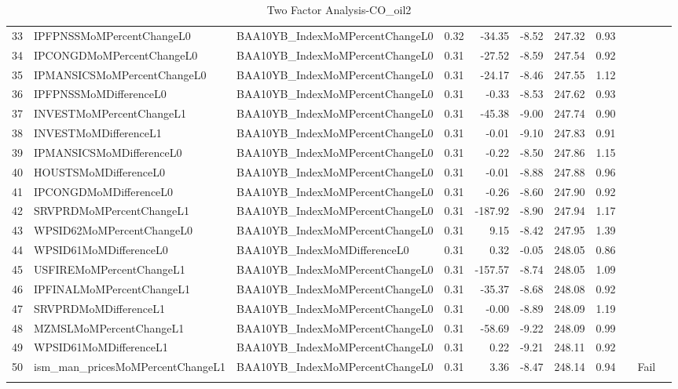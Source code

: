 \begin{longtable}{rllrrrrrlll}
  33 & IPFPNSSMoMPercentChangeL0 & BAA10YB\_IndexMoMPercentChangeL0 & 0.32 & -34.35 & -8.52 & 247.32 & 0.93 &  &  &  \\ 
  34 & IPCONGDMoMPercentChangeL0 & BAA10YB\_IndexMoMPercentChangeL0 & 0.31 & -27.52 & -8.59 & 247.54 & 0.92 &  &  &  \\ 
  35 & IPMANSICSMoMPercentChangeL0 & BAA10YB\_IndexMoMPercentChangeL0 & 0.31 & -24.17 & -8.46 & 247.55 & 1.12 &  &  &  \\ 
  36 & IPFPNSSMoMDifferenceL0 & BAA10YB\_IndexMoMPercentChangeL0 & 0.31 & -0.33 & -8.53 & 247.62 & 0.93 &  &  &  \\ 
  37 & INVESTMoMPercentChangeL1 & BAA10YB\_IndexMoMPercentChangeL0 & 0.31 & -45.38 & -9.00 & 247.74 & 0.90 &  &  &  \\ 
  38 & INVESTMoMDifferenceL1 & BAA10YB\_IndexMoMPercentChangeL0 & 0.31 & -0.01 & -9.10 & 247.83 & 0.91 &  &  &  \\ 
  39 & IPMANSICSMoMDifferenceL0 & BAA10YB\_IndexMoMPercentChangeL0 & 0.31 & -0.22 & -8.50 & 247.86 & 1.15 &  &  &  \\ 
  40 & HOUSTSMoMDifferenceL0 & BAA10YB\_IndexMoMPercentChangeL0 & 0.31 & -0.01 & -8.88 & 247.88 & 0.96 &  &  &  \\ 
  41 & IPCONGDMoMDifferenceL0 & BAA10YB\_IndexMoMPercentChangeL0 & 0.31 & -0.26 & -8.60 & 247.90 & 0.92 &  &  &  \\ 
  42 & SRVPRDMoMPercentChangeL1 & BAA10YB\_IndexMoMPercentChangeL0 & 0.31 & -187.92 & -8.90 & 247.94 & 1.17 &  &  &  \\ 
  43 & WPSID62MoMPercentChangeL0 & BAA10YB\_IndexMoMPercentChangeL0 & 0.31 & 9.15 & -8.42 & 247.95 & 1.39 &  &  &  \\ 
  44 & WPSID61MoMDifferenceL0 & BAA10YB\_IndexMoMDifferenceL0 & 0.31 & 0.32 & -0.05 & 248.05 & 0.86 &  &  &  \\ 
  45 & USFIREMoMPercentChangeL1 & BAA10YB\_IndexMoMPercentChangeL0 & 0.31 & -157.57 & -8.74 & 248.05 & 1.09 &  &  &  \\ 
  46 & IPFINALMoMPercentChangeL1 & BAA10YB\_IndexMoMPercentChangeL0 & 0.31 & -35.37 & -8.68 & 248.08 & 0.92 &  &  &  \\ 
  47 & SRVPRDMoMDifferenceL1 & BAA10YB\_IndexMoMPercentChangeL0 & 0.31 & -0.00 & -8.89 & 248.09 & 1.19 &  &  &  \\ 
  48 & MZMSLMoMPercentChangeL1 & BAA10YB\_IndexMoMPercentChangeL0 & 0.31 & -58.69 & -9.22 & 248.09 & 0.99 &  &  &  \\ 
  49 & WPSID61MoMDifferenceL1 & BAA10YB\_IndexMoMPercentChangeL0 & 0.31 & 0.22 & -9.21 & 248.11 & 0.92 &  &  &  \\ 
  50 & ism\_man\_pricesMoMPercentChangeL1 & BAA10YB\_IndexMoMPercentChangeL0 & 0.31 & 3.36 & -8.47 & 248.14 & 0.94 &  & Fail &  \\ 
   \hline
\hline
\caption{Two Factor Analysis-CO_oil2} 
\end{longtable}

